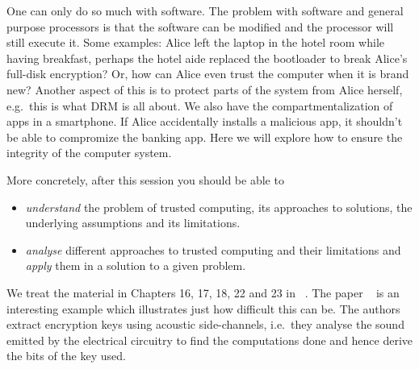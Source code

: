 One can only do so much with software.
The problem with software and general purpose processors is that the software 
can be modified and the processor will still execute it.
Some examples: Alice left the laptop in the hotel room while having breakfast, 
perhaps the hotel aide replaced the bootloader to break Alice's full-disk 
encryption?
Or, how can Alice even trust the computer when it is brand new?
Another aspect of this is to protect parts of the system from Alice herself, 
e.g.\ this is what \ac{DRM} is all about.
We also have the compartmentalization of apps in a smartphone.
If Alice accidentally installs a malicious app, it shouldn't be able to 
compromize the banking app.
Here we will explore how to ensure the integrity of the computer system.

More concretely, after this session you should be able to
\begin{itemize}
  \item \emph{understand} the problem of trusted computing, its approaches to 
    solutions, the underlying assumptions and its limitations.
  \item \emph{analyse} different approaches to trusted computing and their 
    limitations and \emph{apply} them in a solution to a given problem.
\end{itemize}

We treat the material in Chapters 16, 17, 18, 22 and 23 in 
~\cite{Anderson2008sea}.
The paper ~\cite{genkin2013rsa} is an interesting 
example which illustrates just how difficult this can be.
The authors extract encryption keys using acoustic side-channels, i.e.\ they 
analyse the sound emitted by the electrical circuitry to find the computations 
done and hence derive the bits of the key used.
